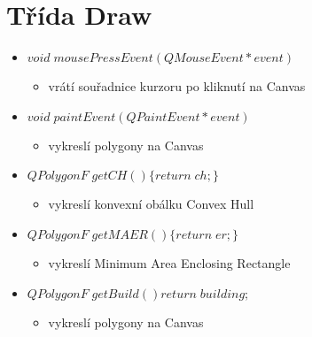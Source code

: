 \documentclass[oneside,12pt,a4paper]{book}
\begin{document}
   \section{Třída Draw} 
    \begin{itemize}
    \item $void\; mousePressEvent(QMouseEvent *event)$
    \begin{itemize}
    \item vrátí souřadnice kurzoru po kliknutí na Canvas
    \end{itemize}
    \item $void\; paintEvent(QPaintEvent *event)$
    \begin{itemize}
    \item vykreslí polygony na Canvas
    \end{itemize}
    
    \item $QPolygonF\; getCH()\{return\; ch;\}$
    \begin{itemize}
    \item vykreslí konvexní obálku Convex Hull
    \end{itemize}
    
    \item $QPolygonF\; getMAER()\{return\; er;\}$
    \begin{itemize}
    \item vykreslí Minimum Area Enclosing Rectangle
    \end{itemize}
    
    \item $QPolygonF\; getBuild(){return\; building;}$
    \begin{itemize}
    \item vykreslí polygony na Canvas
    \end{itemize}


\end{itemize}
\end{document}
